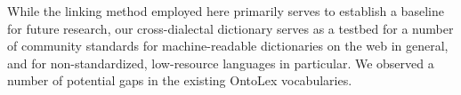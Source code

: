 

While the linking method employed here primarily serves to establish a baseline for future research, our cross-dialectal dictionary serves as a testbed for a number of community standards for machine-readable dictionaries on the web in general, and for non-standardized, low-resource languages in particular.
We observed a number of potential gaps in the existing OntoLex vocabularies. 


